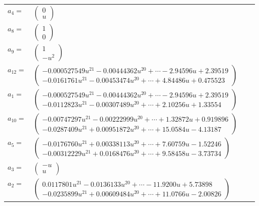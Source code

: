 \documentclass[1p]{elsarticle_modified}
\theoremstyle{definition}
\begin{document}
\begin{tabular}{m{7pt} m{180pt} m{7pt} m{180pt} }
\flushright $a_{4}=$&$\begin{pmatrix}0\\u\end{pmatrix}$ \\
\flushright $a_{8}=$&$\begin{pmatrix}1\\0\end{pmatrix}$ \\
\flushright $a_{9}=$&$\begin{pmatrix}1\\- u^2\end{pmatrix}$ \\
\flushright $a_{12}=$&$\begin{pmatrix}-0.000527549 u^{21}-0.00444362 u^{20}+\cdots-2.94596 u+2.39519\\-0.0161761 u^{21}-0.00453474 u^{20}+\cdots+4.84486 u+0.475523\end{pmatrix}$ \\
\flushright $a_{1}=$&$\begin{pmatrix}-0.000527549 u^{21}-0.00444362 u^{20}+\cdots-2.94596 u+2.39519\\-0.0112823 u^{21}-0.00307489 u^{20}+\cdots+2.10256 u+1.33554\end{pmatrix}$ \\
\flushright $a_{10}=$&$\begin{pmatrix}-0.00747297 u^{21}-0.00222999 u^{20}+\cdots+1.32872 u+0.919896\\-0.0287409 u^{21}+0.00951872 u^{20}+\cdots+15.0584 u-4.13187\end{pmatrix}$ \\
\flushright $a_{5}=$&$\begin{pmatrix}-0.0176760 u^{21}+0.00338113 u^{20}+\cdots+7.60759 u-1.52246\\-0.00312229 u^{21}+0.0168476 u^{20}+\cdots+9.58458 u-3.73734\end{pmatrix}$ \\
\flushright $a_{3}=$&$\begin{pmatrix}- u\\u\end{pmatrix}$ \\
\flushright $a_{2}=$&$\begin{pmatrix}0.0117801 u^{21}-0.0136133 u^{20}+\cdots-11.9200 u+5.73898\\-0.0235899 u^{21}+0.00609484 u^{20}+\cdots+11.0766 u-2.00826\end{pmatrix}$ \\

\end{tabular}
\end{document}
